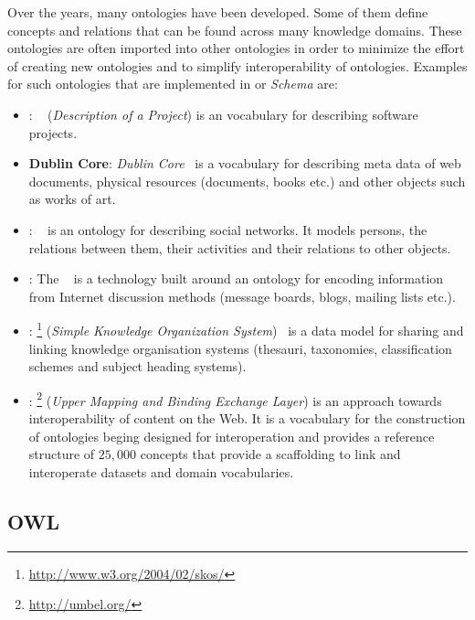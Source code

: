 Over the years, many ontologies have been developed. Some of them define concepts and relations that can be found across many knowledge domains. These ontologies are often imported into other ontologies in order to minimize the effort of creating new ontologies and to simplify interoperability of ontologies. Examples for such ontologies that are implemented in  or \emph{ Schema} are:
\begin{itemize}
  \item \textbf{}: ~\cite{DOAP} (\emph{Description of a Project}) is an vocabulary for describing software projects.
  \item \textbf{Dublin Core}: \emph{Dublin Core}~\cite{DublinCoreWeb,rfc5013} is a vocabulary for describing meta data of web documents, physical resources (documents, books etc.) and other objects such as works of art.
  \item \textbf{}: ~\cite{FOAFWeb,FOAF} is an ontology for describing social networks. It models persons, the relations between them, their activities and their relations to other objects.
  \item \textbf{}: The ~\cite{SIOC} is a technology built around an ontology for encoding information from Internet discussion methods (message boards, blogs, mailing lists etc.).
  \item \textbf{}: \footnote{\href{http://www.w3.org/2004/02/skos/}{http://www.w3.org/2004/02/skos/}} (\emph{Simple Knowledge Organization System})~\cite{SKOS} is a data model for sharing and linking knowledge organisation systems (thesauri, taxonomies, classification schemes and subject heading systems).
  \item \textbf{}: \footnote{\href{http://umbel.org/}{http://umbel.org/}} (\emph{Upper Mapping and Binding Exchange Layer}) is an approach towards interoperability of content on the Web. It is a vocabulary for the construction of ontologies beging designed for interoperation and provides a reference structure of $25,000$ concepts that provide a scaffolding to link and interoperate datasets and domain vocabularies.
\end{itemize}


\subsection{OWL}
\label{subsec:owl}

